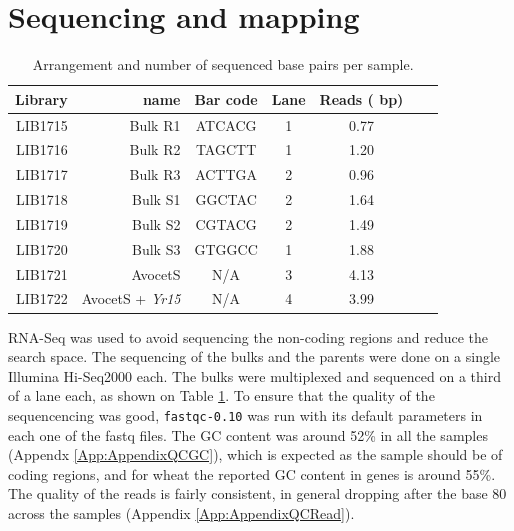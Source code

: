 \section{Sequencing and mapping} 
\label{yr15:sequencing}
\begin{table}
\centering
\caption{Arrangement and number of sequenced base pairs per sample. }
\label{tab:yr15:reads}
\begin{tabular}{rrccccc}
\toprule
Library & name & Bar code & Lane   &  Reads (\e{8} bp)\\ 
\midrule
LIB1715 & Bulk R1 & ATCACG & 1 	& 0.77\\
LIB1716 & Bulk R2 & TAGCTT & 1 		& 1.20\\
LIB1717 & Bulk R3 & ACTTGA & 2 	& 0.96  \\ 
LIB1718 & Bulk S1 & GGCTAC & 2 	& 1.64   \\ 
LIB1719 & Bulk S2 & CGTACG & 2 	& 1.49  \\ 
LIB1720 & Bulk S3 & GTGGCC & 1 	&1.88  \\ 
LIB1721 & AvocetS & N/A & 3 		& 4.13 \\ 
LIB1722 & AvocetS + \textit{Yr15} & N/A & 4 	& 3.99  \\ 
\bottomrule
\end{tabular}
\end{table}

RNA-Seq was used to avoid sequencing the non-coding regions and reduce the search space.  
The sequencing of the bulks and the parents were done on a single Illumina Hi-Seq2000 each.
The bulks were multiplexed and sequenced on a third of a lane each, as shown on Table \ref{tab:yr15:reads}. 
To ensure that the quality of the sequencencing was good, \verb|fastqc-0.10| \citep{fastqc}  was run with its default parameters in each one of the fastq files.  
The GC content was around 52\% in all the samples (Appendx \ref{App:AppendixQCGC}), which is expected as the sample should be of coding regions, and for wheat the reported GC content in genes is around 55\%.  
The quality of the reads is fairly consistent, in general dropping after the base 80 across the samples (Appendix \ref{App:AppendixQCRead}). 




